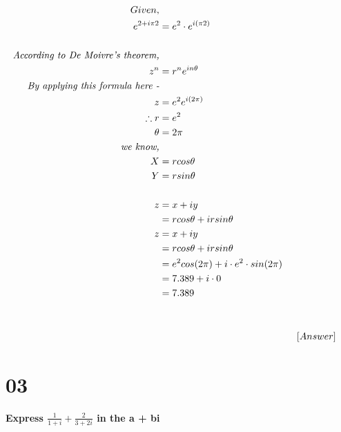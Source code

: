 \documentclass[12pt]{article}
\begin{document}
\begin{align*}
    Given,
    \\
    e^{2+i\pi 2} &= e^2 \cdot e^{i (\pi 2)}
    \\ \\
    \textit{According to De Moivre's theorem,}
    \\
    z^n &= r^n e^{i n \theta}
    \\
    \textit{By applying this formula here -}
    \\
    z &= e^2 e^{i (2\pi)}
    \\
    \therefore r &= e^2
    \\
    \theta &= 2\pi
    \\
    \textit{we know,}
    \\
    X &= r cos \theta 
    \\
    Y &= r sin \theta
    \\\\
    z &= x + i y
    \\
    &= r cos\theta + i r sin \theta
    \\
    z &= x + iy
    \\
    &= r cos \theta + i r sin \theta
    \\
    &= e^2 cos(2\pi) + i \cdot e^2 \cdot sin(2\pi)
    \\
    &= 7.389 + i \cdot 0
    \\
    &= 7.389
    \\ \\ \\
    &\hspace{50mm}[Answer]
\end{align*}

\newpage

                
\chapter{03}
\textbf{Express $\frac{1}{1+i} + \frac{2}{3+2i}$ in the a + bi}
\end{document}
